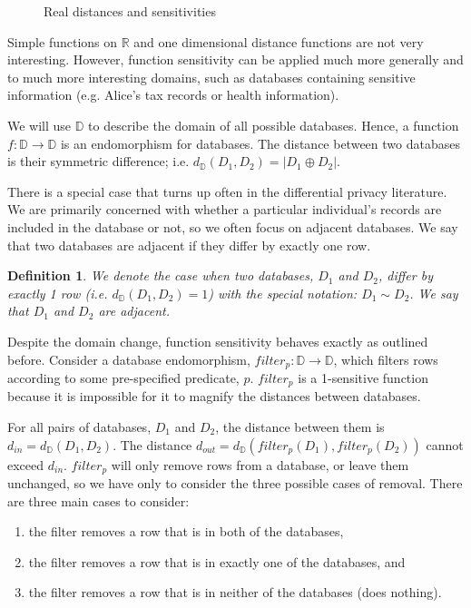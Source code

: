 \documentclass[12pt]{article}
\newtheorem{defn}{Definition}[section]
\begin{document}
\begin{figure}
    \centering
    \def\svgwidth{\columnwidth}
    
    \caption{Real distances and sensitivities}
    \label{fig:fn_sens}
\end{figure}

Simple functions on $\mathbb R$ and one dimensional distance functions are not very interesting.
However, function sensitivity can be applied much more generally and to much more interesting domains, such as databases containing sensitive information (e.g. Alice's tax records or health information).

We will use $\mathbb D$ to describe the domain of all possible databases.
Hence, a function $f : \mathbb D \rightarrow \mathbb D$ is an endomorphism for databases.
The distance between two databases is their symmetric difference; i.e. $d_{\mathbb D}(D_1,D_2) = | D_1 \oplus D_2 |$.

There is a special case that turns up often in the differential privacy literature.
We are primarily concerned with whether a particular individual's records are included in the database or not, so we often focus on adjacent databases.
We say that two databases are adjacent if they differ by exactly one row.

\begin{defn}
  We denote the case when two databases, $D_1$ and $D_2$, differ by exactly 1 row (i.e. $d_{\mathbb D}(D_1,D_2)=1$) with the special notation: $D_1 \sim D_2$.
  We say that $D_1$ and $D_2$ are adjacent.
\end{defn}

Despite the domain change, function sensitivity behaves exactly as outlined before.
Consider a database endomorphism, $filter_p : \mathbb D \rightarrow \mathbb D$, which filters rows according to some pre-specified predicate, $p$.
$filter_p$ is a 1-sensitive function because it is impossible for it to magnify the distances between databases.

For all pairs of databases, $D_1$ and $D_2$, the distance between them is $d_{in} = d_{\mathbb D}(D_1,D_2)$.
The distance $d_{out} = d_{\mathbb D}(filter_p(D_1),filter_p(D_2))$ cannot exceed $d_{in}$.
$filter_p$ will only remove rows from a database, or leave them unchanged, so we have only to consider the three possible cases of removal.
There are three main cases to consider:
\begin{enumerate}
  \item the filter removes a row that is in both of the databases,
  \item the filter removes a row that is in exactly one of the databases, and
  \item the filter removes a row that is in neither of the databases (does nothing).
\end{enumerate}
\end{document}
